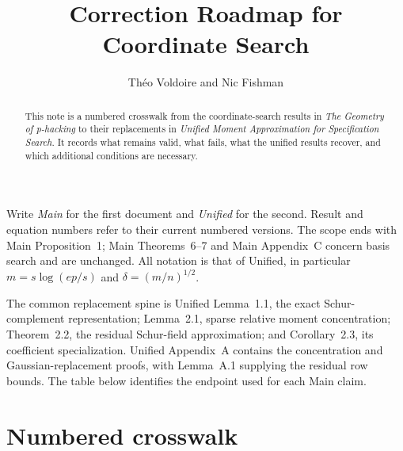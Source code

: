 \documentclass[a4paper,10pt,english]{article}
\title{Correction Roadmap for Coordinate Search}
\author{Th\'eo Voldoire and Nic Fishman}
\date{}
\theoremstyle{definition}
\begin{document}
\maketitle

\begin{abstract}
This note is a numbered crosswalk from the coordinate-search results in
\emph{The Geometry of p-hacking} to their replacements in
\emph{Unified Moment Approximation for Specification Search}.  It records
what remains valid, what fails, what the unified results recover, and
which additional conditions are necessary.
\end{abstract}

Write \emph{Main} for the first document and \emph{Unified} for the
second.  Result and equation numbers refer to their current numbered
versions.  The scope
ends with Main Proposition~1; Main Theorems~6--7
and Main Appendix~C concern basis search and are unchanged.  All notation is
that of Unified, in particular $m=s\log(ep/s)$ and
$\delta=(m/n)^{1/2}$.

The common replacement spine is Unified Lemma~1.1, the exact
Schur-complement representation; Lemma~2.1, sparse relative moment
concentration; Theorem~2.2, the residual Schur-field approximation; and
Corollary~2.3, its coefficient specialization.  Unified Appendix~A
contains the concentration and Gaussian-replacement proofs, with
Lemma~A.1 supplying the residual row bounds.  The table below identifies
the endpoint used for each Main claim.

\section{Numbered crosswalk}
\end{document}
